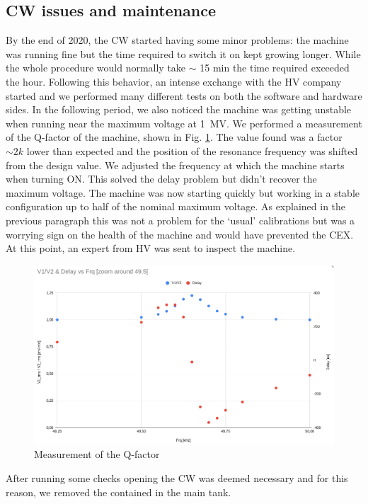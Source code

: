 \begin{refsection}
\section{CW issues and maintenance}
    By the end of 2020, the CW started having some minor problems: the machine was running fine but the time required to switch it on kept growing longer. 
    While the whole procedure would normally take $\sim$ 15 min the time required exceeded the hour.
    Following this behavior, an intense exchange with the HV company started and we performed many different tests on both the software and hardware sides.
    In the following period, we also noticed the machine was getting unstable when running near the maximum voltage at \SI{1}{MV}.
    We performed a measurement of the Q-factor of the machine, shown in Fig. \ref{fig:CW:Q-factor}. The value found was a factor $\sim2k$ lower than expected and the position of the resonance frequency was shifted from the design value.
    We adjusted the frequency at which the machine starts when turning ON. 
    This solved the delay problem but didn't recover the maximum voltage. 
    The machine was now starting quickly but working in a stable configuration up to half of the nominal maximum voltage.
    As explained in the previous paragraph this was not a problem for the `usual' calibrations but was a worrying sign on the health of the machine and would have prevented the CEX.
    At this point, an expert from HV was sent to inspect the machine.
    \begin{figure}
        \centering
        \includegraphics[width=1\textwidth]{Figures/MEG/CW/CW_Q-factor.png}
        \caption{Measurement of the Q-factor}
        \label{fig:CW:Q-factor}
    \end{figure}
    After running some checks opening the CW was deemed necessary and for this reason, we removed the  contained in the main tank. 

\end{refsection}

